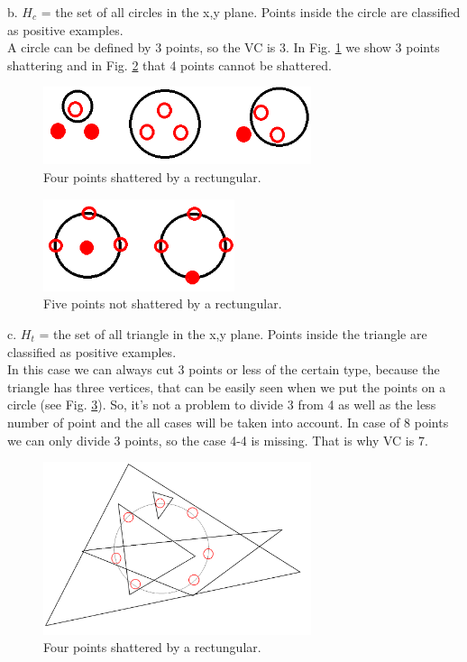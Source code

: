 \documentclass[a4paper, 12pt]{article}
\begin{document}
b. $H_c$ = the set of all circles in the x,y plane. Points inside the circle are classified as positive examples.\\

A circle can be defined by 3 points, so the VC is 3. In Fig. \ref{fig:CirclePoints} we show 3 points shattering and in Fig. \ref{fig:Circle5Points} that 4 points cannot be shattered.

\begin{figure}[h]
  \centering
  \caption{Four points shattered by a rectungular.\label{fig:CirclePoints}}
  \includegraphics[width=0.7\textwidth]{CirclePoints}
\end{figure}

\begin{figure}[h]
  \centering
  \caption{Five points not shattered by a rectungular.\label{fig:Circle5Points}}
  \includegraphics[width=0.5\textwidth]{Circle5Points}
\end{figure}


c. $H_t$ = the set of all triangle in the x,y plane. Points inside the triangle are classified as positive examples.\\

In this case we can always cut 3 points or less of the certain type, because the triangle has three vertices, that can be easily seen when we put the points on a circle (see Fig. \ref{fig:TriPoints}). So, it's not a problem to divide 3 from 4 as well as the less number of point and the all cases will be taken into account. In case of 8 points we can only divide 3 points, so the case 4-4 is missing. That is why VC is 7.

\begin{figure}[h]
  \centering
  \caption{Four points shattered by a rectungular.\label{fig:TriPoints}}
  \includegraphics[width=0.7\textwidth]{TriPoints}
\end{figure}
\end{document}
